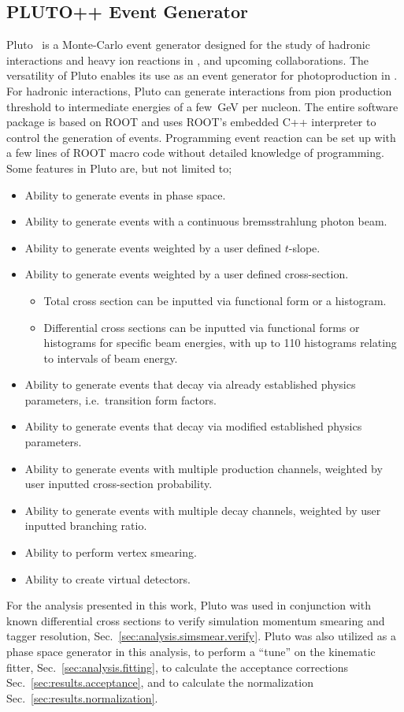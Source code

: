 \subsection{PLUTO++ Event Generator}\label{sec:pluto}

Pluto~\cite{PLUTO} is a Monte-Carlo event generator designed for the study of hadronic interactions and heavy ion reactions in ,  and upcoming  collaborations. The versatility of Pluto enables its use as an event generator for photoproduction in . For hadronic interactions, Pluto can generate interactions from pion production threshold to intermediate energies of a few~GeV per nucleon. The entire software package is based on ROOT and uses ROOT's embedded C++ interpreter to control the generation of events. Programming event reaction can be set up with a few lines of ROOT macro code without detailed knowledge of programming. Some features in Pluto are, but not limited to;
\begin{itemize}
	\item Ability to generate events in phase space.
	\item Ability to generate events with a continuous bremsstrahlung photon beam.
	\item Ability to generate events weighted by a user defined $t$-slope.
	\item Ability to generate events weighted by a user defined cross-section.
	\begin{itemize}
		\item Total cross section can be inputted via functional form or a histogram.
		\item Differential cross sections can be inputted via functional forms or histograms for specific beam energies, with up to 110 histograms relating to intervals of beam energy.
	\end{itemize}
	\item Ability to generate events that decay via already established physics parameters, i.e.~transition form factors.
	\item Ability to generate events that decay via modified established physics parameters.
	\item Ability to generate events with multiple production channels, weighted by user inputted cross-section probability.
	\item Ability to generate events with multiple decay channels, weighted by user inputted branching ratio.
	\item Ability to perform vertex smearing.
	\item Ability to create virtual detectors.
\end{itemize}

For the analysis presented in this work, Pluto was used in conjunction with known differential cross sections to verify simulation momentum smearing and tagger resolution, Sec.~\ref{sec:analysis.simsmear.verify}. Pluto was also utilized as a phase space generator in this analysis, to perform a ``tune'' on the kinematic fitter, Sec.~\ref{sec:analysis.fitting}, to calculate the acceptance corrections Sec.~\ref{sec:results.acceptance}, and to calculate the normalization Sec.~\ref{sec:results.normalization}.
